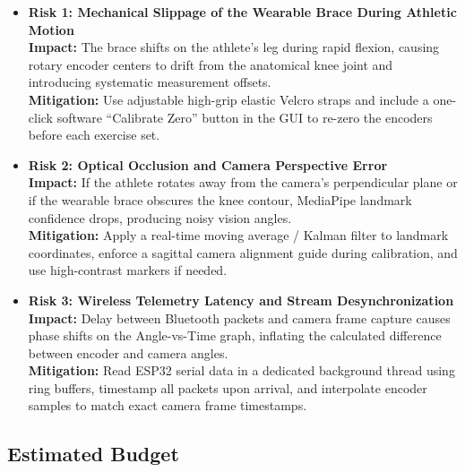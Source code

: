 \documentclass[11pt, a4paper]{article}
\begin{document}
\begin{itemize}[leftmargin=1.5em, itemsep=0.5em]
    \item \textbf{Risk 1: Mechanical Slippage of the Wearable Brace During Athletic Motion}\\
    \textbf{Impact:} The brace shifts on the athlete's leg during rapid flexion, causing rotary encoder centers to drift from the anatomical knee joint and introducing systematic measurement offsets.\\
    \textbf{Mitigation:} Use adjustable high-grip elastic Velcro straps and include a one-click software ``Calibrate Zero'' button in the GUI to re-zero the encoders before each exercise set.

    \item \textbf{Risk 2: Optical Occlusion and Camera Perspective Error}\\
    \textbf{Impact:} If the athlete rotates away from the camera's perpendicular plane or if the wearable brace obscures the knee contour, MediaPipe landmark confidence drops, producing noisy vision angles.\\
    \textbf{Mitigation:} Apply a real-time moving average / Kalman filter to landmark coordinates, enforce a sagittal camera alignment guide during calibration, and use high-contrast markers if needed.

    \item \textbf{Risk 3: Wireless Telemetry Latency and Stream Desynchronization}\\
    \textbf{Impact:} Delay between Bluetooth packets and camera frame capture causes phase shifts on the Angle-vs-Time graph, inflating the calculated difference between encoder and camera angles.\\
    \textbf{Mitigation:} Read ESP32 serial data in a dedicated background thread using ring buffers, timestamp all packets upon arrival, and interpolate encoder samples to match exact camera frame timestamps.
\end{itemize}

\subsection{Estimated Budget}
\end{document}
